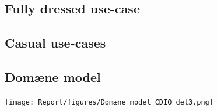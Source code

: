 \begin{flushleft}
\subsection{Fully dressed use-case}

\subsection{Casual use-cases}



\subsection{Domæne model}


\texttt{[image: Report/figures/Domæne model CDIO del3.png]}~\\[1cm]

\end{flushleft}